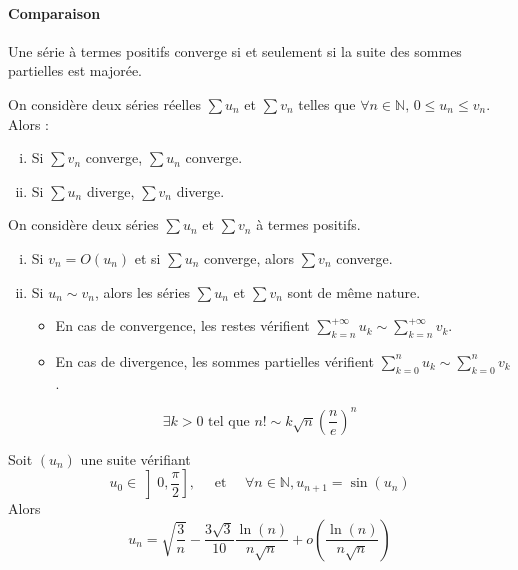 	\paragraph{Comparaison}
	
	\begin{proposition}
		Une série à termes positifs converge si et seulement si la suite des sommes partielles est majorée.
	\end{proposition}
	
	\begin{corollary}
		On considère deux séries réelles $\sum u_n$ et $\sum v_n$ telles que $\forall n \in \mathbb{N}, \, 0 \leq u_n \leq v_n$. Alors :
		\begin{enumerate}[(i)]
			\item Si $\sum v_n$ converge, $\sum u_n$ converge.
			\item Si $\sum u_n$ diverge, $\sum v_n$ diverge.
		\end{enumerate}
	\end{corollary}
	
	\begin{proposition}
		On considère deux séries $\sum u_n$ et $\sum v_n$ à termes positifs.
		\begin{enumerate}[(i)]
			\item Si $v_n = O(u_n)$ et si $\sum u_n$ converge, alors $\sum v_n$ converge.
			\item Si $u_n \sim v_n$, alors les séries $\sum u_n$ et $\sum v_n$ sont de même nature.
			\begin{itemize}
				\item En cas de convergence, les restes vérifient $\sum_{k=n}^{+\infty} u_k \sim \sum_{k=n}^{+\infty} v_k$.
				\item En cas de divergence, les sommes partielles vérifient $\sum_{k=0}^{n} u_k \sim \sum_{k=0}^{n} v_k$.
			\end{itemize}
		\end{enumerate}
	\end{proposition}
	
	
	\begin{application}
		\[ \exists k > 0 \text{ tel que } n! \sim k \sqrt{n} \left( \frac{n}{e} \right)^n \]
	\end{application}
	
	
	\begin{application}
		Soit $(u_n)$ une suite vérifiant
		\[ u_0 \in \left] 0, \frac{\pi}{2} \right], \quad \text{ et } \quad \forall n \in \mathbb{N}, u_{n+1} = \sin(u_n) \]
		Alors
		\[ u_n = \sqrt{\frac{3}{n}} - \frac{3\sqrt{3}}{10} \frac{\ln(n)}{n\sqrt{n}} + o \left( \frac{\ln(n)}{n\sqrt{n}} \right) \]
	\end{application}
	
